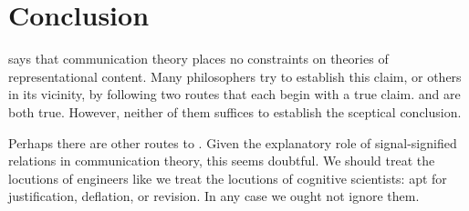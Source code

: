 \documentclass[12pt]{article}
\begin{document}
\section{Conclusion}\label{sec:conclusion}

\tic{} says that communication theory places no constraints on theories of representational content.
Many philosophers try to establish this claim, or others in its vicinity, by following two routes that each begin with a true claim.
\sw{} and \ami{} are both true.
However, neither of them suffices to establish the sceptical conclusion.

Perhaps there are other routes to \tic{}.
Given the explanatory role of signal-signified relations in communication theory, this seems doubtful.
We should treat the locutions of engineers like we treat the locutions of cognitive scientists: apt for justification, deflation, or revision.
In any case we ought not ignore them.



\printbibliography
\end{document}
